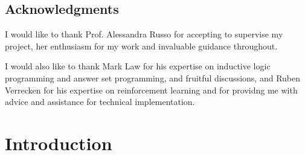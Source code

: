 \documentclass[12pt,twoside]{report}
\date{September 2018}
\theoremstyle{plain}
\theoremstyle{definition}
\let\listoftableandfigures\listoftables
\renewcommand*\listtablename{List of Tables and Figures}
\begin{document}


\clearpage{\pagestyle{empty}\cleardoublepage}
\setcounter{page}{1}
\pagestyle{fancy}

 \begin{abstract}

 \end{abstract}
\cleardoublepage
\section*{Acknowledgments}

I would like to thank Prof. Alessandra Russo for accepting to supervise my project, her enthusiasm for my work and invaluable guidance throughout.

I would also like to thank Mark Law for his expertise on inductive logic programming and answer set programming,  and fruitful discussions, and  Ruben Verrecken for his expertise on reinforcement learning and for providng me with advice and assistance for technical implementation.

\clearpage{\pagestyle{empty}\cleardoublepage}

\tableofcontents

\clearpage{\pagestyle{empty}\cleardoublepage}
\setcounter{page}{1}
\fancyhead[LE,RO]{\slshape \rightmark}
\fancyhead[LO,RE]{\slshape \leftmark}

\renewcommand\listtablename{List of Figures and Tables}
\listoftableandfigures

 


\chapter{Introduction}
\label{introduction}

\end{document}
